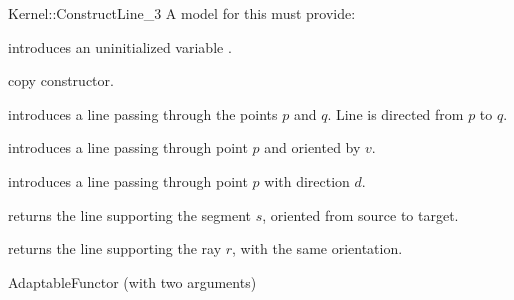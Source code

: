\begin{ccRefFunctionObjectConcept}{Kernel::ConstructLine_3}
A model for this must provide:


\ccHidden {}
             {introduces an uninitialized variable .}

\ccHidden {}
            {copy constructor.}

            {introduces a line  passing through the points $p$ and $q$. 
             Line  is directed from $p$ to $q$.}

            {introduces a line  passing through point $p$ and
             oriented by $v$.}

            {introduces a line  passing through point $p$ with 
             direction $d$.}

            {returns the line supporting the segment $s$,
            oriented from source to target.}

            {returns the line supporting the ray $r$, with the
            same orientation.}

\ccRefines
AdaptableFunctor (with two arguments)

\ccSeeAlso
{}  \\

\end{ccRefFunctionObjectConcept}
